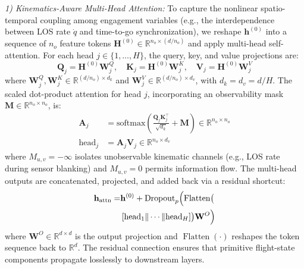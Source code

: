 \documentclass[lettersize,journal]{IEEEtran}
\begin{document}
\emph{1) Kinematics-Aware Multi-Head Attention:} To capture the nonlinear spatio-temporal coupling among engagement variables (e.g., the interdependence between LOS rate $\dot{q}$ and time-to-go synchronization), we reshape $\mathbf{h}^{(0)}$ into a sequence of $n_o$ feature tokens $\mathbf{H}^{(0)} \in \mathbb{R}^{n_o \times (d/n_o)}$ and apply multi-head self-attention. For each head $j \in \{1, \dots, H\}$, the query, key, and value projections are:
\begin{equation}
\label{eq:qkv}
\mathbf{Q}_j = \mathbf{H}^{(0)}\mathbf{W}_j^{Q}, \quad \mathbf{K}_j = \mathbf{H}^{(0)}\mathbf{W}_j^{K}, \quad \mathbf{V}_j = \mathbf{H}^{(0)}\mathbf{W}_j^{V}
\end{equation}
where $\mathbf{W}_j^{Q}, \mathbf{W}_j^{K} \in \mathbb{R}^{(d/n_o) \times d_k}$ and $\mathbf{W}_j^{V} \in \mathbb{R}^{(d/n_o) \times d_v}$, with $d_k = d_v = d/H$. The scaled dot-product attention for head $j$, incorporating an observability mask $\mathbf{M} \in \mathbb{R}^{n_o \times n_o}$, is:
\begin{align}
\mathbf{A}_j &= \mathrm{softmax}\!\left(\frac{\mathbf{Q}_j\mathbf{K}_j^\top}{\sqrt{d_k}} + \mathbf{M}\right) \in \mathbb{R}^{n_o \times n_o} \label{eq:attention} \\
\mathrm{head}_j &= \mathbf{A}_j\mathbf{V}_j \in \mathbb{R}^{n_o \times d_v} \nonumber
\end{align}
where $M_{u,v} = -\infty$ isolates unobservable kinematic channels (e.g., LOS rate during sensor blanking) and $M_{u,v} = 0$ permits information flow. The multi-head outputs are concatenated, projected, and added back via a residual shortcut:
\begin{equation}
\label{eq:mha_out}
\begin{split}
\mathbf{h}_{\mathrm{attn}} =& \mathbf{h}^{(0)} + \mathrm{Dropout}_{p}\Bigl(\operatorname{Flatten}\bigl( \\
&\left[\mathrm{head}_1 \| \cdots \| \mathrm{head}_H\right]\bigr) \mathbf{W}^{O}\Bigr)
\end{split}
\end{equation}
where $\mathbf{W}^{O} \in \mathbb{R}^{d \times d}$ is the output projection and $\operatorname{Flatten}(\cdot)$ reshapes the token sequence back to $\mathbb{R}^d$. The residual connection ensures that primitive flight-state components propagate losslessly to downstream layers.
\end{document}

